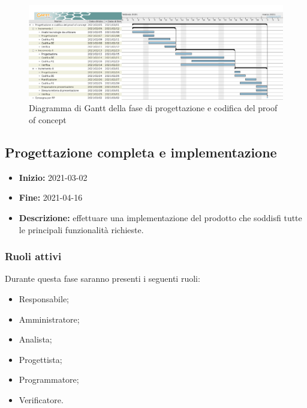 \begin{figure}[H]
    \centering
    \includegraphics[width=1\linewidth]{res/images/pianificazione/progettazione_e_codifica_del_proof_of_concept.png}
    \caption{Diagramma di Gantt della fase di progettazione e codifica del proof of concept}
    \label{fig:_Gantt progettazione e codifica del proof of concept}
\end{figure}



\subsection{Progettazione completa e implementazione} \label{_pianificazioneProgettazioneCompletaImplementazione}
\begin{itemize}
    \item []\textbf{Inizio:} 2021-03-02
    \item []\textbf{Fine:} 2021-04-16
    \item []\textbf{Descrizione:} effettuare una implementazione del prodotto che soddisfi tutte le principali funzionalità richieste.
\end{itemize}

\subsubsection{Ruoli attivi}
Durante questa fase saranno presenti i seguenti ruoli:
\begin{itemize}
    \item Responsabile;
    \item Amministratore;
    \item Analista;
    \item Progettista;
    \item Programmatore;
    \item Verificatore.
\end{itemize}

